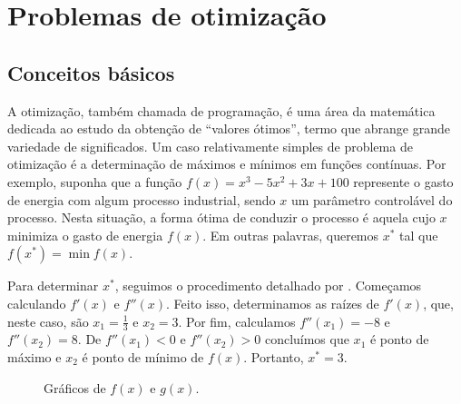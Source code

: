 \section{Problemas de otimização}

\subsection{Conceitos básicos}

A otimização, também chamada de programação, é uma área da matemática dedicada ao estudo da obtenção de ``valores ótimos'', termo que abrange grande variedade de significados. Um caso relativamente simples de problema de otimização é a determinação de máximos e mínimos em funções contínuas. Por exemplo, suponha que a função $f(x) = x^3 - 5x^2 + 3x + 100$ represente o gasto de energia com algum processo industrial, sendo $x$ um parâmetro controlável do processo. Nesta situação, a forma ótima de conduzir o processo é aquela cujo $x$ minimiza o gasto de energia $f(x)$. Em outras palavras, queremos $x^\ast$ tal que $f(x^\ast) = \min f(x)$.

Para determinar $x^\ast$, seguimos o procedimento detalhado por \textcite{STEWART2016}. Começamos calculando $f'(x)$ e $f''(x)$. Feito isso, determinamos as raízes de $f'(x)$, que, neste caso, são $x_1 = \frac{1}{3}$ e $x_2 = 3$. Por fim, calculamos $f''(x_1) = -8$ e $f''(x_2) = 8$. De $f''(x_1) < 0$ e $f''(x_2) > 0$ concluímos que $x_1$ é ponto de máximo e $x_2$ é ponto de mínimo de $f(x)$. Portanto, $x^\ast = 3$.

\begin{figure}[h]
    \centering
    \caption{Gráficos de $f(x)$ e $g(x)$.}
    \label{fig:exemplo otimização contínua}
\end{figure}

